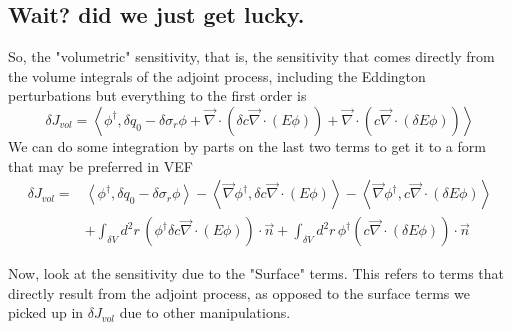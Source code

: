 \documentclass{article}
\newcommand{\bra}{\left\langle}
\newcommand{\ket}{\right\rangle}
\newcommand{\vdiv}{\vec{\nabla} \cdot}
\newcommand{\vgrad}{\vec{\nabla}}
\begin{document}
\subsection{Wait? did we just get lucky.}
So, the "volumetric" sensitivity, that is, the sensitivity that comes directly from the volume integrals of the adjoint process, including the Eddington perturbations but everything to the first order is
\[
\delta J_{vol} = \bra \phi^\dag , \delta q_0 - \delta \sigma_r \phi + \vdiv \left( \delta c \vdiv \left( E \phi \right) \right) + \vdiv \left( c \vdiv \left( \delta E \phi \right) \right)  \ket
\]
We can do some integration by parts on the last two terms to get it to a form that may be preferred in VEF
\begin{align*}
\delta J_{vol} =& \bra \phi^\dag , \delta q_0 - \delta \sigma_r \phi \ket -  \bra \vgrad \phi^\dag ,  \delta c \vdiv \left( E \phi  \right) \ket - \bra \vgrad \phi^\dag ,  c \vdiv \left( \delta E \phi \right)   \ket \\
&+ \int_{\delta V} d^2 r \, \left( \phi^\dag \delta c \vdiv \left( E \phi \right) \right) \cdot \vec{n} + \int_{\delta V} d^2 r \, \phi^\dag  \left(  c \vdiv \left( \delta E \phi \right) \right) \cdot \vec{n}
\end{align*}

Now, look at the sensitivity due to the "Surface" terms. This refers to terms that directly result from the adjoint process, as opposed to the surface terms we picked up in $\delta J_{vol}$ due to other manipulations.
\end{document}
